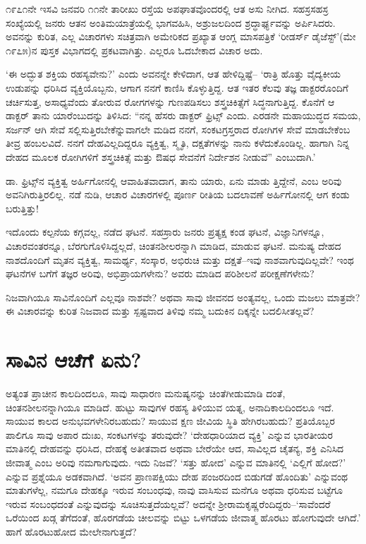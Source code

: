 ೧೯೭೧ನೇ ಇಸವಿ ಜನವರಿ ೧೧ನೇ ತಾರೀಖು ರಸ್ತೆಯ ಅಪಘಾತವೊಂದರಲ್ಲಿ ಆತ ಅಸು ನೀಗಿದ. ಸಹಸ್ರಸಹಸ್ರ ಸಂಖ್ಯೆಯಲ್ಲಿ ಜನರು ಆತನ ಅಂತಿಮಯಾತ್ರೆಯಲ್ಲಿ ಭಾಗವಹಿಸಿ, ಅಶ್ರುಜಲದಿಂದ ಶ್ರದ್ಧಾರ್ಘ್ಯವನ್ನು ಅರ್ಪಿಸಿದರು. ಅವನನ್ನು ಕುರಿತ, ಎಲ್ಲ ವಿಚಾರಗಳು ಸಚಿತ್ರವಾಗಿ ಅಮೇರಿಕದ ಪ್ರಖ್ಯಾತ ಆಂಗ್ಲ ಮಾಸಪತ್ರಿಕೆ ‘ರೀಡರ್ಸ್ ಡೈಜೆಸ್ಟ್​’(ಮೇ ೧೯೭೫)ನ ಪುಸ್ತಕ ವಿಭಾಗದಲ್ಲಿ ಪ್ರಕಟವಾಗಿತ್ತು. ಎಲ್ಲರೂ ಓದಬೇಕಾದ ವಿಚಾರ ಅದು.

‘ಈ ಅದ್ಭುತ ಶಕ್ತಿಯ ರಹಸ್ಯವೇನು?’ ಎಂದು ಅವನನ್ನೇ ಕೇಳಿದಾಗ, ಆತ ಹೇಳಿದ್ದಿಷ್ಟೆ– ‘ರಾತ್ರಿ ಹೊತ್ತು ವೈದ್ಯಕೀಯ ಉಡುಪನ್ನು ಧರಿಸಿದ ವ್ಯಕ್ತಿಯೊಬ್ಬನು, ಆಗಾಗ ನನಗೆ ಕಾಣಿಸಿ ಕೊಳ್ಳುತ್ತಿದ್ದ. ಆತ ಇತರ ಕೆಲವು ತಜ್ಞ ಡಾಕ್ಟರರೊಂದಿಗೆ ಚರ್ಚಿಸುತ್ತ, ಅಸಾಧ್ಯವೆಂದು ತೋರುವ ರೋಗಗಳನ್ನು ಗುಣಪಡಿಸಲು ಶಸ್ತ್ರಚಿಕಿತ್ಸೆಗೆ ಸಿದ್ಧನಾಗುತ್ತಿದ್ದ. ಕೊನೆಗೆ ಆ ಡಾಕ್ಟರ್ ತಾನು ಯಾರೆಂಬುದನ್ನು ತಿಳಿಸಿದ: “ನನ್ನ ಹೆಸರು ಡಾಕ್ಟರ್ ಫ್ರಿಟ್ಸ್ ಎಂದು. ಎರಡನೇ ಮಹಾಯುದ್ಧದ ಸಮಯ, ಸರ್ಜನ್ ಆಗಿ ಸೇವೆ ಸಲ್ಲಿಸುತ್ತಿರಬೇಕೆನ್ನುವಾಗಲೇ ಮಡಿದ ನನಗೆ, ಸಂಕಟಗ್ರಸ್ತರಾದ ರೋಗಿಗಳ ಸೇವೆ ಮಾಡಬೇಕೆಂಬ ತೀವ್ರ ಹಂಬಲವಿದೆ. ನನಗೆ ದೇಹವಿಲ್ಲದಿದ್ದರೂ ವ್ಯಕ್ತಿತ್ವ, ಸ್ಮೃತಿ, ದಕ್ಷತೆಗಳನ್ನು ನಾನು ಕಳೆದುಕೊಂಡಿಲ್ಲ. ಹಾಗಾಗಿ ನಿನ್ನ ದೇಹದ ಮೂಲಕ ರೋಗಿಗಳಿಗೆ ಶಸ್ತ್ರಚಿಕಿತ್ಸೆ ಮತ್ತು ಔಷಧ ಸೇವನೆಗೆ ನಿರ್ದೇಶನ ನೀಡುವೆ” ಎಂಬುದಾಗಿ.’

ಡಾ. ಫ್ರಿಟ್ಸ್​ನ ವ್ಯಕ್ತಿತ್ವ ಅರ್ಹಿಗೋನಲ್ಲಿ ಆವಾಹಿತವಾದಾಗ, ತಾನು ಯಾರು, ಏನು ಮಾಡು ತ್ತಿದ್ದೇನೆ, ಎಂಬ ಅರಿವು ಅವನಿಗಿರುತ್ತಿರಲಿಲ್ಲ. ನಡೆ ನುಡಿ, ಆಚಾರ ವಿಚಾರಗಳಲ್ಲಿ ಪೂರ್ಣ ರೀತಿಯ ಬದಲಾವಣೆ ಅರ್ಹಿಗೋನಲ್ಲಿ ಆಗ ಕಂಡು ಬರುತ್ತಿತ್ತು!

ಇದೊಂದು ಕಲ್ಪನೆಯ ಕಗ್ಗವಲ್ಲ, ನಡೆದ ಘಟನೆ. ಸಹಸ್ರಾರು ಜನರು ಪ್ರತ್ಯಕ್ಷ ಕಂಡ ಘಟನೆ, ವಿಜ್ಞಾನಿಗಳನ್ನೂ, ವಿಚಾರವಂತರನ್ನೂ, ಬೆರಗುಗೊಳಿಸಿದ್ದಲ್ಲದೆ, ಚಿಂತನಶೀಲರನ್ನಾಗಿ ಮಾಡಿದ, ಮಾಡುವ ಘಟನೆ. ಮನುಷ್ಯ ದೇಹದ ನಾಶದೊಂದಿಗೆ ಮೃತನ ವ್ಯಕ್ತಿತ್ವ, ಸಾಮರ್ಥ್ಯ, ಸಂಸ್ಕಾರ, ಅಭಿರುಚಿ ಮತ್ತು ದಕ್ಷತೆ–ಇವು ನಾಶವಾಗುವುದಿಲ್ಲವೇ? ಇಂಥ ಘಟನೆಗಳ ಬಗೆಗೆ ತಜ್ಞರ ಅರಿವು, ಅಭಿಪ್ರಾಯಗಳೇನು? ಅವರು ಮಾಡಿದ ಪರಿಶೀಲನೆ ಪರೀಕ್ಷಣೆಗಳೇನು?

ನಿಜವಾಗಿಯೂ ಸಾವಿನೊಂದಿಗೆ ಎಲ್ಲವೂ ನಾಶವೇ? ಅಥವಾ ಸಾವು ಜೀವನದ ಅಂತ್ಯವಲ್ಲ, ಒಂದು ಮಜಲು ಮಾತ್ರವೇ? ಈ ವಿಚಾರವನ್ನು ಕುರಿತ ನಿಜವಾದ ಮತ್ತು ಸ್ಪಷ್ಟವಾದ ತಿಳಿವು ನಮ್ಮ ಬದುಕಿನ ದಿಕ್ಕನ್ನೇ ಬದಲಿಸೀತಲ್ಲವೆ?


\section{ಸಾವಿನ ಆಚೆಗೆ ಏನು?}

ಅತ್ಯಂತ ಪ್ರಾಚೀನ ಕಾಲದಿಂದಲೂ, ಸಾವು ಸಾಧಾರಣ ಮನುಷ್ಯನನ್ನು ಚಿಂತೆಗೀಡುಮಾಡಿ ದಂತೆ, ಚಿಂತನಶೀಲನನ್ನಾಗಿಯೂ ಮಾಡಿದೆ. ಹುಟ್ಟು ಸಾವುಗಳ ರಹಸ್ಯ ತಿಳಿಯುವ ಯತ್ನ, ಅನಾದಿಕಾಲದಿಂದಲೂ ಇದೆ. ಸಾಯುವ ಕಾಲದ ಅನುಭವಗಳೇನಿರಬಹುದು? ಸಾಯುವ ಕ್ಷಣ ಜೀವಿಯ ಸ್ಥಿತಿ ಹೇಗಿರಬಹುದು? ಪ್ರತಿಯೊಬ್ಬರ ಪಾಲಿಗೂ ಸಾವು ಅಪಾರ ದುಃಖ, ಸಂಕಟಗಳನ್ನು ತರುವುದೇ? ‘ದೇಹಧಾರಿಯಾದ ವ್ಯಕ್ತಿ’ ಎನ್ನುವ ಭಾರತೀಯರ ಮಾತಿನಲ್ಲಿ ದೇಹವನ್ನು ಧರಿಸಿದ, ದೇಹಕ್ಕೆ ಅತೀತವಾದ ಅಥವಾ ಬೇರೆಯೇ ಆದ, ಸಾವಿಲ್ಲದ ಚೈತನ್ಯ, ಶಕ್ತಿ ಎನಿಸಿದ ಜೀವಾತ್ಮ ಎಂಬ ಅರಿವು ನಮಗಾಗುವುದು. ಇದು ನಿಜವೆ? ‘ಸತ್ತು ಹೋದ’ ಎನ್ನುವ ಮಾತಿನಲ್ಲಿ ‘ಎಲ್ಲಿಗೆ ಹೋದ?’ ಎನ್ನುವ ಪ್ರಶ್ನೆಯೂ ಅಡಕವಾಗಿದೆ. ‘ಅವನ ಪ್ರಾಣಪಕ್ಷಿಯು ದೇಹ ಪಂಜರದಿಂದ ಬಿಡುಗಡೆ ಹೊಂದಿತು’ ಎನ್ನುವಂಥ ಮಾತುಗಳೆಲ್ಲ, ನಮಗೂ ದೇಹಕ್ಕೂ ಇರುವ ಸಂಬಂಧವು, ನಾವು ವಾಸಿಸುವ ಮನೆಗೂ ಅಥವಾ ಧರಿಸುವ ಬಟ್ಟೆಗೂ ಇರುವ ಸಂಬಂಧದಂತೆ ಎನ್ನುವುದನ್ನು ಸೂಚಿಸುತ್ತದೆಯಲ್ಲವೆ? ಅದನ್ನೇ ಶ‍್ರೀರಾಮಕೃಷ್ಣರೆಂದಿದ್ದರು–‘ಸಾವೆಂದರೆ ಒರೆಯಿಂದ ಖಡ್ಗ ತೆಗೆದಂತೆ, ಹೊರಗಡೆಯ ಚೀಲವನ್ನು ಬಿಟ್ಟು ಒಳಗಡೆಯ ಜೀವಾತ್ಮ ಹೊರಟು ಹೋಗುವುದೇ ಆಗಿದೆ.’ ಹಾಗೆ ಹೊರಟುಹೋದ ಮೇಲೇನಾಗುತ್ತದೆ?

